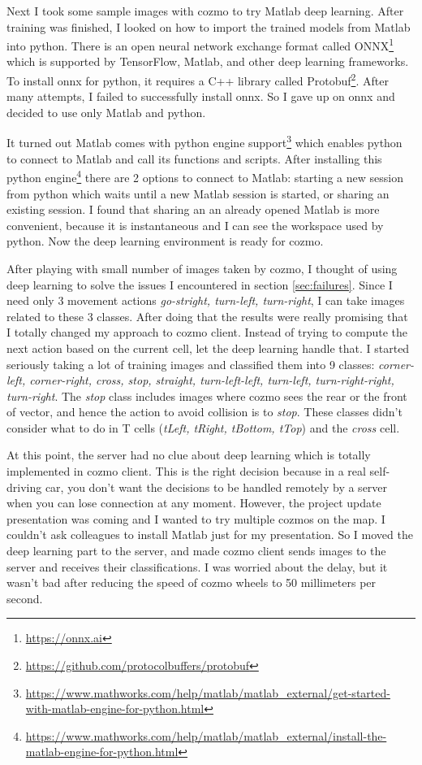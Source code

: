 \documentclass[12pt,a4paper]{article}
\begin{document}
Next I took some sample images with cozmo to try Matlab deep learning. After training was finished, I looked on how to import the trained models from Matlab into python. There is an open neural network exchange format called ONNX\footnote{\url{https://onnx.ai}} which is supported by TensorFlow, Matlab, and other deep learning frameworks. To install onnx for python, it requires a C++ library called Protobuf\footnote{\url{https://github.com/protocolbuffers/protobuf}}. After many attempts, I failed to successfully install onnx. So
I gave up on onnx and decided to use only Matlab and python. 

It turned out Matlab comes with python engine support\footnote{\url{https://www.mathworks.com/help/matlab/matlab_external/get-started-with-matlab-engine-for-python.html}} which enables python to connect to Matlab and call its functions and scripts. After installing this python engine\footnote{\url{https://www.mathworks.com/help/matlab/matlab_external/install-the-matlab-engine-for-python.html}} there are 2 options to connect to Matlab: starting a new session from python which waits until a new Matlab session is started, or sharing an existing session. I found that sharing an an already opened Matlab is more convenient, because it is instantaneous and I can see the workspace used by python. Now the deep learning environment is ready for cozmo.  

After playing with small number of images taken by cozmo, I thought of using deep learning to solve the issues I encountered in section \ref{sec:failures}. Since I need only 3 movement actions \textit{go-stright, turn-left, turn-right}, I can take images related to these 3 classes. After doing that the results were really promising that I totally changed my approach to cozmo client. Instead of trying to compute the next action based on the current cell, let the deep learning handle that. I started seriously taking a lot of training images and classified them into 9 classes: 
\textit{corner-left,
corner-right,
cross,
stop,
straight,
turn-left-left,
turn-left,
turn-right-right,
turn-right}. The \textit{stop} class includes images where cozmo sees the rear or the front of vector, and hence the action to avoid collision is to \textit{stop}. These classes didn't consider what to do in T cells (\textit{tLeft, tRight, tBottom, tTop}) and the \textit{cross} cell. 

At this point, the server had no clue about deep learning which is totally implemented in cozmo client. This is the right decision because in a real self-driving car, you don't want the decisions to be handled remotely by a server when you can lose connection at any moment. However, the project update presentation was coming and I wanted to try multiple cozmos on the map. I couldn't ask colleagues to install Matlab just for my presentation. So I moved the deep learning part to the server, and made cozmo client sends images to the server and receives their classifications. I was worried about the delay, but it wasn't bad after reducing the speed of cozmo wheels to 50 millimeters per second.  
 
\end{document}
